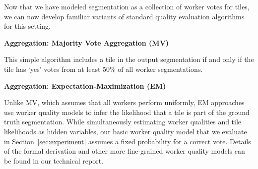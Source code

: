 \documentclass[letterpaper]{article}
\newcommand{\techreport}[1]{}
\newcommand{\agp}[1]{\textcolor{magenta}{Aditya: #1}}
\newcommand{\stitle}[1]{\noindent \textbf{#1}}
\begin{document}
\par Now that we have modeled segmentation as a collection of worker votes for tiles, we can now develop familiar variants of standard quality evaluation algorithms for this setting.

\stitle{Aggregation: Majority Vote Aggregation (MV)} 
\par \noindent This simple algorithm includes a tile in the output segmentation if and only if the tile has `yes' votes from at least 50\% of all worker segmentations.

\stitle{Aggregation: Expectation-Maximization (EM)}
\par \noindent Unlike MV, which assumes that all workers perform uniformly, EM approaches use worker quality models to infer the likelihood that a tile is part of the ground truth segmentation. While simultaneously estimating worker qualities and tile likelihoods as hidden variables, 
our basic worker quality model that we evaluate in Section~\ref{sec:experiment} assumes a fixed probability for a correct vote.
\techreport{Another model variant accounts for tile areas based on the intuition that workers should be penalized more if they make a mistake on a large tile (e.g. yellow tile in Figure \ref{tile_demo} middle) than on a small tile (e.g. orange tiles near the boundary in Figure \ref{tile_demo} middle). Our advanced %
worker quality model additionally accounts for true- and false-positive rates of the worker's tile votes.}Details of the formal derivation and other more fine-grained worker quality models can be found in our technical report.
\end{document}
